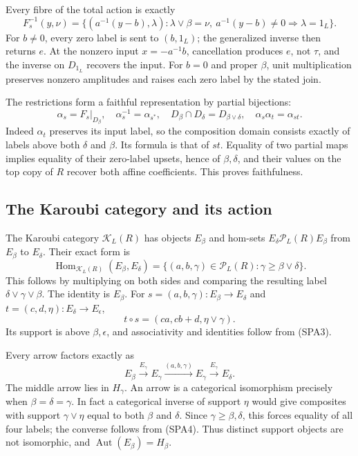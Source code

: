 Every fibre of the total action is exactly
\begin{equation}\tag{SPA12}
F_s^{-1}(y,\nu)=
\{(a^{-1}(y-b),\lambda):
\lambda\vee\beta=\nu,\
a^{-1}(y-b)\ne0\Rightarrow\lambda=1_L\}.
\end{equation}
For $b\ne0$, every zero label is sent to $(b,1_L)$; the
generalized inverse then returns $e$. At the nonzero input
$x=-a^{-1}b$, cancellation produces $e$, not $\tau$, and
the inverse on $D_{1_L}$ recovers the input.
For $b=0$ and proper $\beta$, unit multiplication preserves
nonzero amplitudes and raises each zero label by the stated join.

The restrictions form a faithful representation by partial bijections:
\begin{equation}\tag{SPA13}
\alpha_s=F_s|_{D_\beta},\quad
\alpha_s^{-1}=\alpha_{s^*},\quad
D_\beta\cap D_\delta=D_{\beta\vee\delta},\quad
\alpha_s\alpha_t=\alpha_{st}.
\end{equation}
Indeed $\alpha_t$ preserves its input label, so the composition
domain consists exactly of labels above both $\delta$ and
$\beta$. Its formula is that of $st$.
Equality of two partial maps implies equality of their
zero-label upsets, hence of $\beta,\delta$, and their values
on the top copy of $R$ recover both affine coefficients.
This proves faithfulness.

\subsection{The Karoubi category and its action}

The Karoubi category $\mathcal K_L(R)$ has objects $E_\beta$
and hom-sets $E_\delta\mathcal P_L(R)E_\beta$ from $E_\beta$
to $E_\delta$. Their exact form is
\begin{equation}\tag{SPA14}
\operatorname{Hom}_{\mathcal K_L(R)}(E_\beta,E_\delta)
=\{(a,b,\gamma)\in\mathcal P_L(R):\gamma\ge\beta\vee\delta\}.
\end{equation}
This follows by multiplying on both sides and comparing
the resulting label $\delta\vee\gamma\vee\beta$.
The identity is $E_\beta$. For
$s=(a,b,\gamma):E_\beta\to E_\delta$ and
$t=(c,d,\eta):E_\delta\to E_\epsilon$,
\[
t\circ s=(ca,cb+d,\eta\vee\gamma).
\]
Its support is above $\beta,\epsilon$, and associativity
and identities follow from (SPA3).

Every arrow factors exactly as
\begin{equation}\tag{SPA15}
E_\beta\xrightarrow{E_\gamma}E_\gamma
\xrightarrow{(a,b,\gamma)}E_\gamma
\xrightarrow{E_\gamma}E_\delta.
\end{equation}
The middle arrow lies in $H_\gamma$.
An arrow is a categorical isomorphism precisely when
$\beta=\delta=\gamma$. In fact a categorical inverse of
support $\eta$ would give composites with support
$\gamma\vee\eta$ equal to both $\beta$ and $\delta$.
Since $\gamma\ge\beta,\delta$, this forces equality of all
four labels; the converse follows from (SPA4).
Thus distinct support objects are not isomorphic, and
$\operatorname{Aut}(E_\beta)=H_\beta$.

